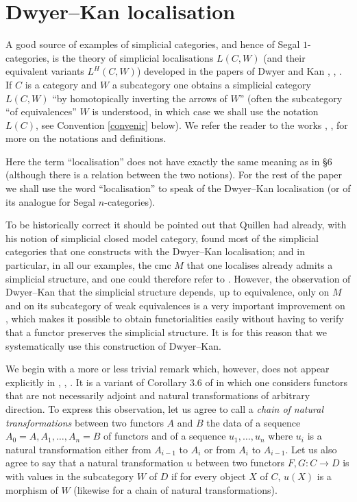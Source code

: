 
\clearpage
\section{Dwyer--Kan localisation}
\label{dwyerkanpage}


A good source of examples of simplicial categories, and hence of Segal
$1$-categories, is the theory of simplicial localisations $L(C,W)$
(and their equivalent variants $L^H(C,W)$) developed in the
papers of Dwyer and Kan \cite{DwyerKan1}, \cite{DwyerKan2}, \cite{DwyerKan3}.
If $C$ is a category and $W$ a subcategory one obtains a simplicial
category $L(C,W)$ ``by homotopically inverting the arrows of $W$''
(often the subcategory ``of equivalences'' $W$ is understood, in which
case we shall use the notation $L(C)$, see Convention \ref{convenir}
below). We refer the reader to the works \cite{DwyerKan1},
\cite{DwyerKan2}, \cite{DwyerKan3} for more on the notations and
definitions.


Here the term ``localisation'' does not have exactly
the same meaning as in \S 6 (although there is a relation between the
two notions). For the rest of the paper we shall use the word
``localisation'' to speak of the Dwyer--Kan localisation (or of its
analogue for Segal $n$-categories).

To be historically correct it should be pointed out that Quillen
\cite{Quillen} had already, with
his notion of simplicial closed model category, found
most of the simplicial categories that one constructs with the
Dwyer--Kan localisation; and in particular, in all our examples, the cmc
$M$ that one localises already admits a
simplicial structure, and one could therefore refer to
\cite{Quillen}.
However, the observation of Dwyer--Kan that
the simplicial structure depends,
up to equivalence, only on $M$ and on its subcategory of weak
equivalences is a very important improvement on \cite{Quillen}, which makes it
possible to obtain functorialities easily without having to verify that a
functor preserves the simplicial structure. It is for this reason
that we systematically use
this construction of Dwyer--Kan.


We begin with a more or less trivial remark which, however,
does not appear explicitly in
\cite{DwyerKan1}, \cite{DwyerKan2}, \cite{DwyerKan3}. It is
a variant of Corollary 3.6 of \cite{DwyerKan2} in which one
considers functors that are not necessarily
adjoint and natural transformations of arbitrary direction.
To express this observation, let us agree to call a {\em chain of
natural transformations} between two functors $A$ and $B$ the data
of a sequence $A_0=A, A_1, \dots, A_n=B$ of functors and of a sequence
$u_1, \dots, u_n$ where $u_i$ is a natural transformation
either from $A_{i-1}$ to $A_i$ or from $A_i$ to $A_{i-1}$. Let us also
agree
to say that a natural transformation $u$ between two
functors $F, G: C \rightarrow D$ is with
values
in the subcategory $W$ of $D$ if for every object $X$ of $C$,
$u(X)$ is a morphism of $W$ (likewise for a chain of
natural transformations).

